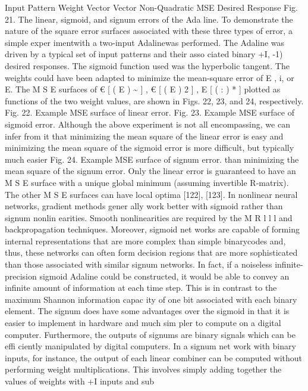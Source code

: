 \documentclass[11pt,a4paper,twocolumn]{article}
\begin{document}
{Input Pattern 
Weight 
Vector 
Vector 
Non-Quadratic MSE 
Desired Response 
Fig. 21. The linear, sigmoid, and signum errors of the Ada
line. 
To demonstrate the nature of the square error surfaces 
associated with these three types of error, a simple exper
imentwith a two-input Adalinewas performed. The Adaline 
was driven by a typical set of input patterns and their asso
ciated binary { +I, -1) desired responses. The sigmoid 
function used was the hyperbolic tangent. The weights 
could have been adapted to minimize the mean-square 
error of E ,  i, or E. The M S E  surfaces of € [ ( E ) \~{} ] ,  € [ ( E ) 2 ] ,  E [ ( : ) * ]  
plotted as functions of the two weight values, are shown 
in Figs. 22, 23, and 24, respectively. 
Fig. 22. Example MSE surface of linear error. 
Fig. 23. Example MSE surface of sigmoid error. 
Although the above experiment is not all encompassing, 
we can infer from it that minimizing the mean square of the 
linear error is easy and minimizing the mean square of the 
sigmoid error is more difficult, but typically much easier 
Fig. 24. Example MSE surface of signum error. 
than minimizing the mean square of the signum error. Only 
the linear error is guaranteed to have an M S E  surface with 
a unique global minimum (assuming invertible R-matrix). 
The other M S E  surfaces can have local optima [122], [123]. 
In nonlinear neural networks, gradient methods gener
ally work better with sigmoid rather than signum nonlin
earities. Smooth nonlinearities are required by the M R l l l  
and backpropagation techniques. Moreover, sigmoid net
works are capable of forming internal representations that 
are more complex than simple binarycodes and, thus, these 
networks can often form decision regions that are more 
sophisticated than those associated with similar signum 
networks. In fact, if a noiseless infinite-precision sigmoid 
Adaline could be constructed, it would be able to convey 
an infinite amount of information at each time step. This 
is in contrast to the maximum Shannon information capac
ity of one bit associated with each binary element. 
The signum does have some advantages over the sigmoid 
in that it is easier to implement in hardware and much sim
pler to compute on a digital computer. Furthermore, the 
outputs of signums are binary signals which can be effi
ciently manipulated by digital computers. In a signum net
work with binary inputs, for instance, the output of each 
linear combiner can be computed without performing 
weight multiplications. This involves simply adding 
together the values of weights with +I inputs and sub
}}
\end{document}
